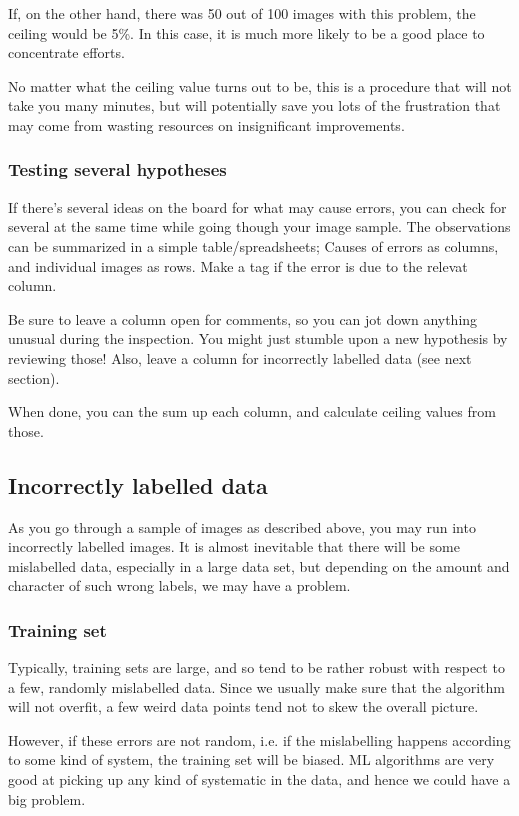 \documentclass[12pt, a4paper]{article}
\numberwithin{equation}{section}
\begin{document}
If, on the other hand, there was 50 out of 100 images with this problem, the ceiling would be 5\%. In this case, it is much more likely to be a good place to concentrate efforts.

No matter what the ceiling value turns out to be, this is a procedure that will not take you many minutes, but will potentially save you lots of the frustration that may come from wasting resources on insignificant improvements.

\subsubsection{Testing several hypotheses}
If there's several ideas on the board for what may cause errors, you can check for several at the same time while going though your image sample. The observations can be summarized in a simple table/spreadsheets; Causes of errors as columns, and individual images as rows. Make a tag if the error is due to the relevat column.

Be sure to leave a column open for comments, so you can jot down anything unusual during the inspection. You might just stumble upon a new hypothesis by reviewing those! Also, leave a column for incorrectly labelled data (see next section).

When done, you can the sum up each column, and calculate ceiling values from those.

\subsection{Incorrectly labelled data}
As you go through a sample of images as described above, you may run into incorrectly labelled images. It is almost inevitable that there will be some mislabelled data, especially in a large data set, but depending on the amount and character of such wrong labels, we may have a problem.

\subsubsection{Training set}
Typically, training sets are large, and so tend to be rather robust with respect to a few, randomly mislabelled data. Since we usually make sure that the algorithm will not overfit, a few weird data points tend not to skew the overall picture.

However, if these errors are not random, i.e. if the mislabelling happens according to some kind of system, the training set will be biased. ML algorithms are very good at picking up any kind of systematic in the data, and hence we could have a big problem.
\end{document}
